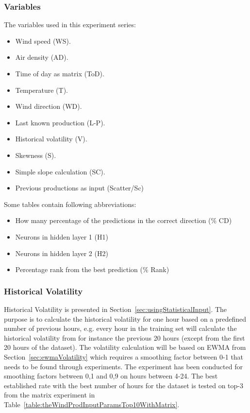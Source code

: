 \subsubsection{Variables}
The variables used in this experiment series:

\begin{itemize}
\item Wind speed (WS).
\item Air density (AD).
\item Time of day as matrix (ToD).
\item Temperature (T).
\item Wind direction (WD).
\item Last known production (L-P).
\item Historical volatility (V).
\item Skewness (S).
\item Simple slope calculation (SC).
\item Previous productions as input (Scatter/Sc)
\end{itemize}

Some tables contain following abbreviations:

\begin{itemize}
\item How many percentage of the predictions in the correct direction (\% CD)
\item Neurons in hidden layer 1 (H1)
\item Neurons in hidden layer 2 (H2)
\item Percentage rank from the best prediction (\% Rank)
\end{itemize}

\subsubsection{Historical Volatility}
\label{sec:predictionHistVol}
Historical Volatility is presented in Section~\ref{sec:usingStatisticalInput}. The purpose is to calculate the historical volatility for one hour based on a predefined number of previous hours, e.g. every hour in the training set will calculate the historical volatility from for instance the previous 20 hours (except from the first 20 hours of the dataset). The volatility calculation will be based on EWMA from Section~\ref{sec:ewmaVolatility} which requires a smoothing factor between 0-1 that needs to be found through experiments. The experiment has been conducted for smoothing factors between 0,1 and 0,9 on hours between 4-24. The best established rate with the best number of hours for the dataset is tested on top-3 from the matrix experiment in Table~\ref{table:theWindProdInputParamsTop10WithMatrix}.

